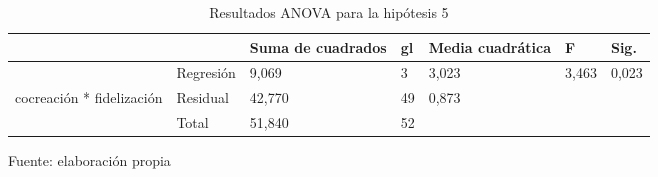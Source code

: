 \begin{table}[h]
    \caption {Resultados ANOVA para la hipótesis 5}
	\label{tab:anovaH5}
	\setlength\extrarowheight{5pt}
	
	\begin{tabular}{p{2.1cm} p{3.1cm} p{1.8cm} p{0.9cm} p{1.8cm} p{0.9cm} p{2.0cm}}
	\toprule
			&						& Suma de cuadrados	& gl	& Media cuadrática	& F	& Sig. \\
	\midrule
			& Regresión						& 9,069		& 3		& 3,023	& 3,463	& 0,023 \\
	cocreación * fidelización	& Residual	& 42,770	& 49	& 0,873	&	& \\
			& Total							& 51,840	& 52 \\
	\bottomrule
	\end{tabular}
	
	\center
	\footnotesize
	Fuente: elaboración propia
\end{table}
